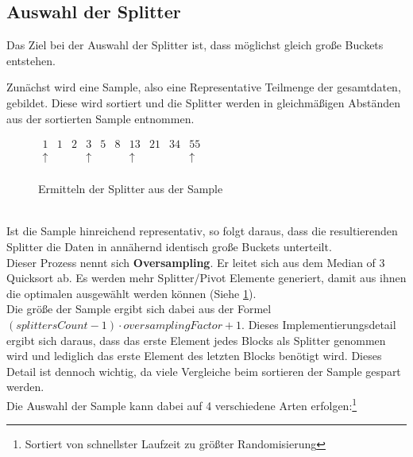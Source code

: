 	\subsection{Auswahl der Splitter}
		Das Ziel bei der Auswahl der Splitter ist, dass möglichst gleich große Buckets entstehen.
		
		Zunächst wird eine Sample, also eine Representative Teilmenge der gesamtdaten, gebildet.
		Diese wird sortiert und die Splitter werden in gleichmäßigen Abständen aus der sortierten Sample entnommen.\\
		\begin{figure}[h]
			\caption{Ermitteln der Splitter aus der Sample \autocite{benson-2022}}
			\label{fig:splitters-from-sample}
			\begin{center}
				\begin{math}
					\begin{matrix}
							1    & 1 & 2 &     3    & 5 & 8 &    13    & 21 & 34 &    55    \\
						\uparrow &   &   & \uparrow &   &   & \uparrow &    &    & \uparrow \\
					\end{matrix}
				\end{math}
			\end{center}
		\end{figure}\\
		Ist die Sample hinreichend representativ, so folgt daraus, dass die resultierenden Splitter die Daten in annähernd identisch große Buckets unterteilt.\\
		Dieser Prozess nennt sich \textbf{Oversampling}.
		Er leitet sich aus dem Median of 3 Quicksort ab.
		Es werden mehr Splitter/Pivot Elemente generiert, damit aus ihnen die optimalen ausgewählt werden können (Siehe \ref{fig:splitters-from-sample}).\\
		Die größe der Sample ergibt sich dabei aus der Formel $(\textit{splittersCount}-1)\cdot\textit{oversamplingFactor}+1$.
		Dieses Implementierungsdetail ergibt sich daraus, dass das erste Element jedes Blocks als Splitter genommen wird und lediglich das erste Element des letzten Blocks benötigt wird.
		Dieses Detail ist dennoch wichtig, da viele Vergleiche beim sortieren der Sample gespart werden.\\
		Die Auswahl der Sample kann dabei auf 4 verschiedene Arten erfolgen:\footnote{Sortiert von schnellster Laufzeit zu größter Randomisierung} \autocite{berlin-2007}

